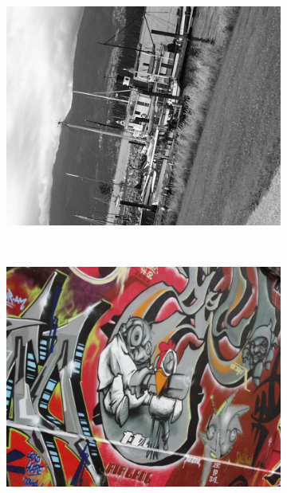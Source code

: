 \documentclass[10pt,twocolumn,letterpaper]{article}
\begin{document}
\begin{figure}[htb]
    \begin{subfigure}[t]{0.20\columnwidth}
        \centering
        \includegraphics[width=1\columnwidth]{images/acr/boat4}
    \end{subfigure}%
    ~ %
    \begin{subfigure}[t]{0.20\columnwidth}
        \centering
        \includegraphics[width=1\columnwidth]{images/acr/graf3}
    \end{subfigure}%
    ~ %
    \begin{subfigure}[t]{0.24\columnwidth}
        \centering

\end{subfigure}
\end{figure}
\end{document}
